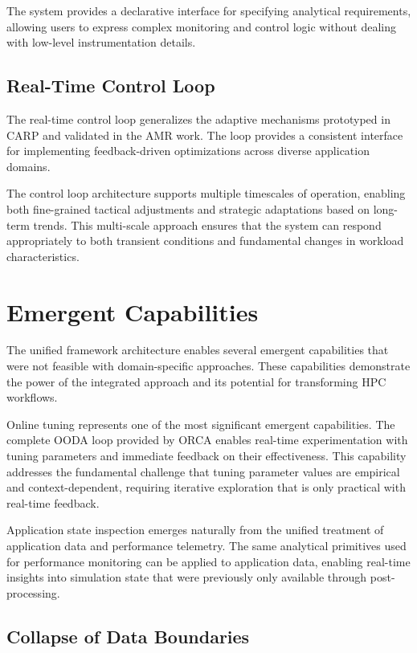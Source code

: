 The system provides a declarative interface for specifying analytical requirements, allowing
users to express complex monitoring and control logic without dealing with low-level
instrumentation details.

\subsection{Real-Time Control Loop}

The real-time control loop generalizes the adaptive mechanisms prototyped in CARP and validated
in the AMR work.
The loop provides a consistent interface for implementing feedback-driven optimizations across
diverse application domains.

The control loop architecture supports multiple timescales of operation, enabling both
fine-grained tactical adjustments and strategic adaptations based on long-term trends.
This multi-scale approach ensures that the system can respond appropriately to both transient
conditions and fundamental changes in workload characteristics.

\section{Emergent Capabilities}

The unified framework architecture enables several emergent capabilities that were not feasible
with domain-specific approaches.
These capabilities demonstrate the power of the integrated approach and its potential for
transforming HPC workflows.

Online tuning represents one of the most significant emergent capabilities.
The complete OODA loop provided by ORCA enables real-time experimentation with tuning parameters
and immediate feedback on their effectiveness.
This capability addresses the fundamental challenge that tuning parameter values are empirical
and context-dependent, requiring iterative exploration that is only practical with real-time
feedback.

Application state inspection emerges naturally from the unified treatment of application data
and performance telemetry.
The same analytical primitives used for performance monitoring can be applied to application
data, enabling real-time insights into simulation state that were previously only available
through post-processing.

\subsection{Collapse of Data Boundaries}

